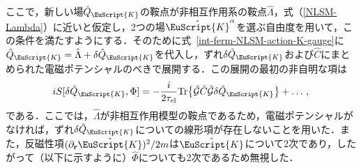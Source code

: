 \documentclass[a4paper,11pt]{ltjsarticle}
\def\Tr{\mathrm{Tr}}
\def\Qk{\hat{Q}_{\EuScript{K}}}
\def\tauel{\tau_{\mathrm{el}}}
\begin{document}
ここで，新しい場$\Qk$の鞍点が非相互作用系の鞍点$\hat \Lambda$，式（\ref{NLSM-Lambda}）に近いと仮定し，2つの場$\hat{\EuScript{K}}^\alpha$を選ぶ自由度を用いて，この条件を満たすようにする．そのために式~\eqref{int-ferm-NLSM-action-K-gauge}に$\Qk=\hat{\Lambda}+\delta\Qk$を代入し，ずれ$\delta\Qk$および$\hat C$にまとめられた電磁ポテンシャルのべきで展開する．この展開の最初の非自明な項は
\begin{equation}\label{int-ferm-NLSM-action-Q-linear}
iS[\delta \hat Q_{\EuScript{K}},\Phi]= -\frac{i}{2\tauel}
\Tr\big\{\hat{\mathcal{G}}\hat{C}\hat{\mathcal{G}}\delta\Qk\big\}+\ldots\,,
\end{equation}
である．ここでは，$\hat{\Lambda}$が非相互作用模型の鞍点であるため，電磁ポテンシャルがなければ，ずれ$\delta\Qk$についての線形項が存在しないことを用いた．また，反磁性項$(\partial_{\mathbf{r}}\hat{\EuScript{K}})^{2}/2m$は$\hat{\EuScript{K}}$について2次であり，したがって（以下に示すように）$\hat{\Phi}$についても2次であるため無視した．
\end{document}
